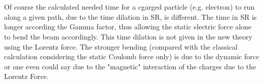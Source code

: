 \documentclass[10pt,titlepage]{article}
\begin{document}
\\\\
Of course the calculated needed time for a cgarged particle (e.g. electron) to run along a given path, due to the time dilation in SR, is different. The time in SR is longer according the Gamma factor, thus allowing the static electric force alone to bend the beam accordingly. This time dilation is not given in the new theory using the Lorentz force. The stronger bending (compared with the classical calculation considering the static Coulomb force only) is due to the dynamic force or one even could say due to the "magnetic" interaction of the charges due to the Lorentz Force.
\\\\

\end{document}
